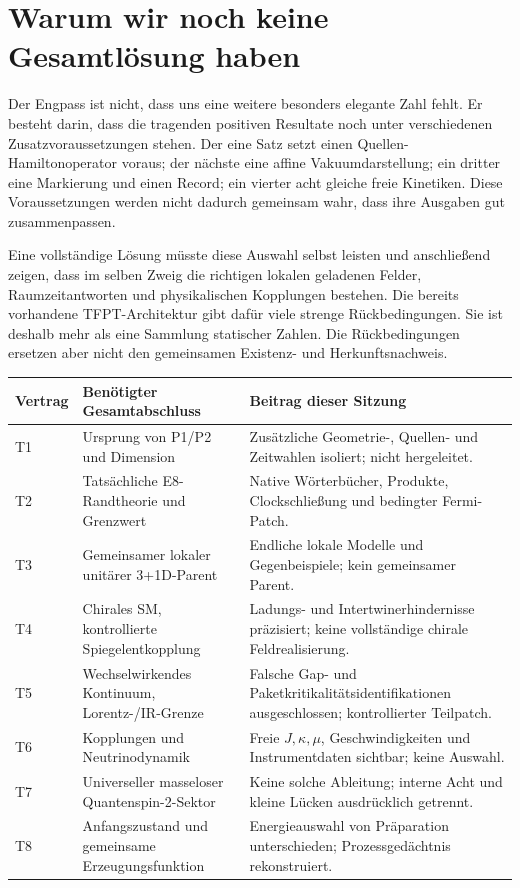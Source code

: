 \section{Warum wir noch keine Gesamtlösung haben}
Der Engpass ist nicht, dass uns eine weitere besonders elegante Zahl fehlt. Er besteht darin, dass die tragenden positiven Resultate noch unter verschiedenen Zusatzvoraussetzungen stehen. Der eine Satz setzt einen Quellen-Hamiltonoperator voraus; der nächste eine affine Vakuumdarstellung; ein dritter eine Markierung und einen Record; ein vierter acht gleiche freie Kinetiken. Diese Voraussetzungen werden nicht dadurch gemeinsam wahr, dass ihre Ausgaben gut zusammenpassen.

Eine vollständige Lösung müsste diese Auswahl selbst leisten und anschließend zeigen, dass im selben Zweig die richtigen lokalen geladenen Felder, Raumzeitantworten und physikalischen Kopplungen bestehen. Die bereits vorhandene TFPT-Architektur gibt dafür viele strenge Rückbedingungen. Sie ist deshalb mehr als eine Sammlung statischer Zahlen. Die Rückbedingungen ersetzen aber nicht den gemeinsamen Existenz- und Herkunftsnachweis.

\noindent\begin{tabularx}{\textwidth}{@{}lYY@{}}
\toprule
Vertrag & Benötigter Gesamtabschluss & Beitrag dieser Sitzung\\\midrule
T1 & Ursprung von P1/P2 und Dimension & Zusätzliche Geometrie-, Quellen- und Zeitwahlen isoliert; nicht hergeleitet.\\
T2 & Tatsächliche E8-Randtheorie und Grenzwert & Native Wörterbücher, Produkte, Clockschließung und bedingter Fermi-Patch.\\
T3 & Gemeinsamer lokaler unitärer 3+1D-Parent & Endliche lokale Modelle und Gegenbeispiele; kein gemeinsamer Parent.\\
T4 & Chirales SM, kontrollierte Spiegelentkopplung & Ladungs- und Intertwinerhindernisse präzisiert; keine vollständige chirale Feldrealisierung.\\
T5 & Wechselwirkendes Kontinuum, Lorentz-/IR-Grenze & Falsche Gap- und Paketkritikalitätsidentifikationen ausgeschlossen; kontrollierter Teilpatch.\\
T6 & Kopplungen und Neutrinodynamik & Freie $J,\kappa,\mu$, Geschwindigkeiten und Instrumentdaten sichtbar; keine Auswahl.\\
T7 & Universeller masseloser Quantenspin-2-Sektor & Keine solche Ableitung; interne Acht und kleine Lücken ausdrücklich getrennt.\\
T8 & Anfangszustand und gemeinsame Erzeugungsfunktion & Energieauswahl von Präparation unterschieden; Prozessgedächtnis rekonstruiert.\\\bottomrule
\end{tabularx}

